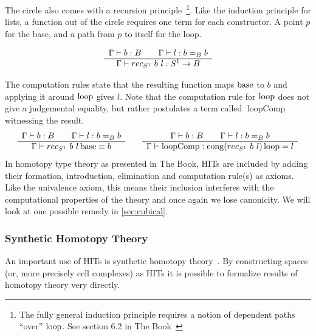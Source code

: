 The circle also comes with a recursion principle~\footnote{The fully general
  induction principle requires a notion of dependent paths ``over'' $\operatorname{loop}$. See section 6.2 in
  The Book~\cite{hottbook}}. Like the induction principle for lists,
a function out of the circle requires one term for each constructor. A point $p$
for the base, and a path from $p$ to itself for the loop.

\begin{equation*}
  \begin{array}[t]{c}
    \Gamma \vdash b : B \qquad \Gamma \vdash l : b =_B b\\
    \hline
    \Gamma \vdash rec_{S^1}~b~l : S^1 \rightarrow B
  \end{array}
\end{equation*}

The computation rules state that the resulting function maps $\operatorname{base}$ to $b$
and applying it around $\operatorname{loop}$ gives $l$.
Note that the computation rule for $\operatorname{loop}$ does not give a judgemental
equality, but rather postulates a term called $\operatorname{loopComp}$
witnessing the result.
\begin{equation*}
  \begin{array}[t]{c}
    \Gamma \vdash b : B \qquad \Gamma \vdash l : b =_B b\\
    \hline
    \Gamma \vdash rec_{S^1}~b~l \operatorname{base} \equiv b
  \end{array}
  \qquad
  \begin{array}[t]{c}
    \Gamma \vdash b : B \qquad \Gamma \vdash l : b =_B b\\
    \hline
    \Gamma \vdash \operatorname{loopComp} : \operatorname{cong} (rec_{S^1}~b~l) \operatorname{loop} = l
  \end{array}
\end{equation*}
In homotopy type theory as presented in The Book, HITs are included by adding
their formation, introduction, elimination and computation rule(s) as axioms.
Like the univalence axiom, this means their inclusion interferes with the
computational properties of the theory and once again we lose canonicity.
We will look at one possible remedy in \autoref{sec:cubical}.

\subsubsection{Synthetic Homotopy Theory}
An important use of HITs is synthetic homotopy theory~\cite{mortberg2020cubical,
  licata2015cubical}. By constructing spaces (or, more precisely cell
complexes) as HITs it is possible to formalize results of homotopy theory very
directly.

